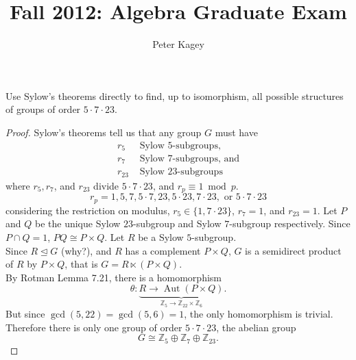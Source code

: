 \documentclass{article}
\newenvironment{problem}[2][Problem]{\begin{trivlist}
\item[\hskip \labelsep {\bfseries #1}\hskip \labelsep {\bfseries #2.}]}{\end{trivlist}}
\newcommand{\Z}{\mathbb Z}
\newcommand{\normalsubgroup}{\trianglelefteq}
\begin{document}
\title{Fall 2012: Algebra Graduate Exam}
\author{Peter Kagey}

\maketitle

\begin{problem}{1}
  Use Sylow's theorems directly to find, up to isomorphism, all possible
  structures of groups of order $5 \cdot 7 \cdot 23$.
\end{problem}

\begin{proof}
  Sylow's theorems tell us that any group $G$ must have \begin{align*}
    r_5 &\text{ Sylow } 5\text{-subgroups,} \\
    r_7 &\text{ Sylow } 7\text{-subgroups, and} \\
    r_{23} &\text{ Sylow } 23\text{-subgroups}
  \end{align*} where $r_5, r_7$, and $r_{23}$ divide $5 \cdot 7 \cdot 23$, and $r_p \equiv 1 \bmod p$. \[
    r_p = 1, 5, 7, 5 \cdot 7, 23, 5 \cdot 23, 7 \cdot 23, \text{ or } 5 \cdot 7 \cdot 23
  \] considering the restriction on modulus,
  $r_5 \in \{1, 7 \cdot 23\}$, $r_7 = 1$, and $r_{23} = 1$.
  Let $P$ and $Q$ be the unique Sylow $23$-subgroup and Sylow
  $7$-subgroup respectively.
  Since $P \cap Q = 1$, $PQ \cong P \times Q$. Let $R$ be a Sylow $5$-subgroup.
  \\
  Since $R \normalsubgroup G$ (why?), and $R$ has a complement $P \times Q$, $G$ is a
  semidirect product of $R$ by $P \times Q$, that is $G = R \ltimes (P \times Q)$.
  \\
  By Rotman Lemma 7.21, there is a homomorphism \[
    \theta\colon \underbrace{
      R \rightarrow \operatorname{Aut}(P \times Q)
    }_{\Z_5 \rightarrow \Z_{22} \times \Z_6}.
  \]
  But since $\gcd(5, 22) = \gcd(5, 6) = 1$, the only homomorphism is trivial.
  Therefore there is only one group of order $5 \cdot 7 \cdot 23$, the abelian
  group \[
    G \cong \Z_5 \oplus \Z_7 \oplus \Z_{23}.
  \]
\end{proof}
\pagebreak
\end{document}
